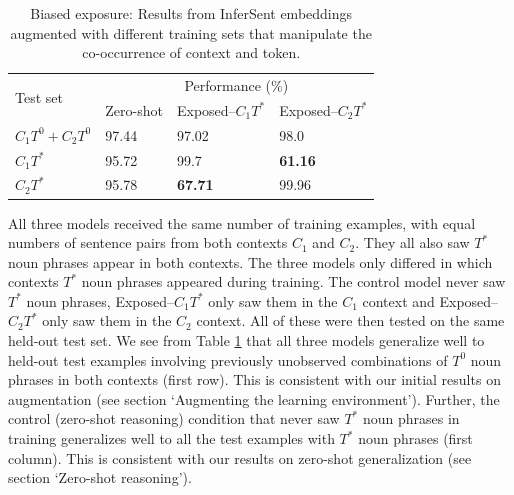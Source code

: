 \begin{table}[h!]
  \begin{center}
    \begin{tabular}{llll}
    \toprule
     \multirow{2}{*}{Test set} &
      \multicolumn{3}{c}{Performance (\%)} \\
       & Zero-shot  & Exposed--$C_{1}T^{*}$ & Exposed--$C_{2}T^{*}$ \\
    \midrule
    $C_{1}T^{0} + C_{2}T^{0}$ & 97.44 & 97.02 & 98.0\\
    
    $C_{1}T^{*}$  & 95.72 & 99.7 & \bf{61.16}  \\
    
     $C_{2}T^{*}$ & 95.78 & \bf{67.71} & 99.96 \\
    
\bottomrule
\end{tabular}
\end{center}
\caption{Biased exposure: Results from InferSent embeddings augmented with different training sets that manipulate the co-occurrence of context and token.}
  \label{tab:comb}
\end{table}

All three models received the same number of training examples, with equal numbers of sentence pairs from both contexts $C_{1}$ and $C_{2}$. They all also saw $T^{*}$ noun phrases appear in both contexts. The three models only differed in which contexts $T^{*}$ noun phrases appeared during training. The control model never saw $T^{*}$ noun phrases, Exposed--$C_{1}T^{*}$  only saw them in the $C_1$ context and Exposed--$C_{2}T^{*}$ only saw them in the $C_2$ context. All of these were then tested on the same held-out test set. We see from Table \ref{tab:comb} that all three models generalize well to held-out test examples involving previously unobserved combinations of $T^{0}$ noun phrases in both contexts (first row). This is consistent with our initial results on augmentation (see section `Augmenting the learning environment'). Further, the control (zero-shot reasoning) condition that never saw $T^{*}$ noun phrases in training generalizes well to all the test examples with $T^{*}$ noun phrases (first column). This is consistent with our results on zero-shot generalization (see section `Zero-shot reasoning'). 

